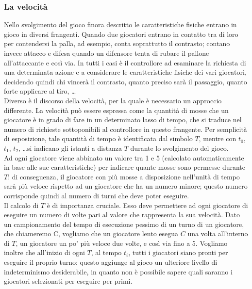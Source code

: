 \subsubsection{La velocità}
\label{sec:analisi_concorrenza_velocita}

Nello svolgimento del gioco finora descritto le caratteristiche fisiche entrano in gioco in diversi frangenti. Quando due giocatori entrano in contatto tra di loro per contendersi la palla, ad esempio, conta soprattutto il contrasto; contano invece attacco e difesa quando un difensore tenta di rubare il pallone all'attaccante e così via. In tutti i casi è il controllore ad esaminare la richiesta di una determinata azione e a considerare le caratteristiche fisiche dei vari giocatori, decidendo quindi chi vincerà il contrasto, quanto preciso sarà il passaggio, quanto forte applicare al tiro, \ldots\\

Diverso è il discorso della velocità, per la quale è necessario un approccio differente. La velocità può essere espressa come la quantità di mosse che un giocatore è in grado di fare in un determinato lasso di tempo, che si traduce nel numero di richieste sottoponibili al controllore in questo frangente. Per semplicità di esposizione, tale quantità di tempo è identificata dal simbolo $T$, mentre con $t_0$, $t_1$, $t_2$, \ldots si indicano gli istanti a distanza $T$ durante lo svolgimento del gioco.\\

Ad ogni giocatore viene abbinato un valore tra 1 e 5 (calcolato automaticamente in base alle sue caratteristiche) per indicare quante mosse sono permesse durante $T$: di conseguenza, il giocatore con più mosse a disposizione nell'unità di tempo sarà più veloce rispetto ad un giocatore che ha un numero minore; questo numero corrisponde quindi al numero di turni che deve poter eseguire.\\

Il calcolo di $T$ è di importanza cruciale. Esso deve permettere ad ogni giocatore di eseguire un numero di volte pari al valore che rappresenta la sua velocità. Dato un campionamento del tempo di esecuzione pessimo di un turno di un giocatore, che chiameremo C, vogliamo che un giocatore lento esegua $C$ una volta all'interno di $T$, un giocatore un po' più veloce due volte, e così via fino a 5. Vogliamo inoltre che all'inizio di ogni $T$, al tempo $t_i$, tutti i giocatori siano pronti per eseguire il proprio turno: questo aggiunge al gioco un ulteriore livello di indeterminismo desiderabile, in quanto non è possibile sapere quali saranno i giocatori selezionati per eseguire per primi.\\

